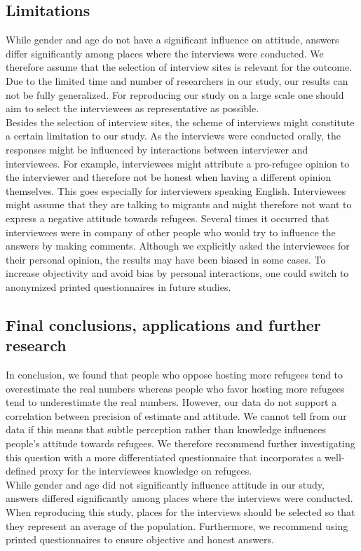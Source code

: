 \subsection{Limitations}
While gender and age do not have a significant influence on attitude, answers differ significantly among places where the interviews were conducted. We therefore assume that the selection of interview sites is relevant for the outcome. Due to the limited time and number of researchers in our study, our results can not be fully generalized. For reproducing our study on a large scale one should aim to select the interviewees as representative as possible.\\
Besides the selection of interview sites, the scheme of interviews might constitute a certain limitation to our study. As the interviews were conducted orally, the responses might be influenced by interactions between interviewer and interviewees. For example, interviewees might attribute a pro-refugee opinion to the interviewer and therefore not be honest when having a different opinion themselves. This goes especially for interviewers speaking English. Interviewees might assume that they are talking to migrants and might therefore not want to express a negative attitude towards refugees. Several times it occurred that interviewees were in company of other people who would try to influence the answers by making comments. Although we explicitly asked the interviewees for their personal opinion, the results may have been biased in some cases. To increase objectivity and avoid bias by personal interactions, one could switch to anonymized printed questionnaires in future studies.\\

\subsection{Final conclusions, applications and further research}

In conclusion, we found that people who oppose hosting more refugees tend to overestimate the real numbers whereas people who favor hosting more refugees tend to underestimate the real numbers. However, our data do not support a correlation between precision of estimate and attitude. We cannot tell from our data if this means that subtle perception rather than knowledge influences people's attitude towards refugees. We therefore recommend further investigating this question with a more differentiated questionnaire that incorporates a well-defined proxy for the interviewees knowledge on refugees.\\
While gender and age did not significantly influence attitude in our study, answers differed significantly among places where the interviews were conducted. When reproducing this study, places for the interviews should be selected so that they represent an average of the population. Furthermore, we recommend using printed questionnaires to ensure objective and honest answers.
